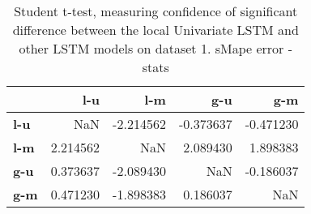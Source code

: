 \begin{table}[h]
\centering
\caption{Student t-test, measuring confidence of significant difference between the local Univariate LSTM and other LSTM models on dataset 1. sMape error - stats}
\label{table:ttest-stats-lstm-experiments-sMAPE-dataset-1}
\begin{tabular}{lrrrr}
\toprule
{} &       l-u &       l-m &       g-u &       g-m \\
\midrule
\textbf{l-u} &       NaN & -2.214562 & -0.373637 & -0.471230 \\
\textbf{l-m} &  2.214562 &       NaN &  2.089430 &  1.898383 \\
\textbf{g-u} &  0.373637 & -2.089430 &       NaN & -0.186037 \\
\textbf{g-m} &  0.471230 & -1.898383 &  0.186037 &       NaN \\
\bottomrule
\end{tabular}
\end{table}
